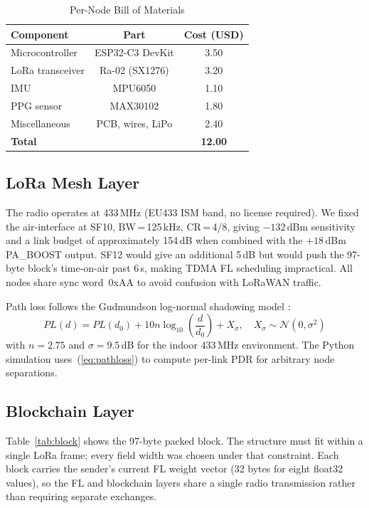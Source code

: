 \documentclass[journal]{IEEEtran}
\begin{document}
\begin{table}[t]
\centering
\caption{Per-Node Bill of Materials}
\label{tab:bom}
\renewcommand{\arraystretch}{1.2}
\begin{tabular}{lcc}
\toprule
\textbf{Component} & \textbf{Part} & \textbf{Cost (USD)} \\
\midrule
Microcontroller   & ESP32-C3 DevKit    & 3.50 \\
LoRa transceiver  & Ra-02 (SX1276)     & 3.20 \\
IMU               & MPU6050            & 1.10 \\
PPG sensor        & MAX30102           & 1.80 \\
Miscellaneous     & PCB, wires, LiPo   & 2.40 \\
\midrule
\textbf{Total}    &                    & \textbf{12.00} \\
\bottomrule
\end{tabular}
\end{table}

\subsection{LoRa Mesh Layer}

The radio operates at 433\,MHz (EU433 ISM band, no license required). We
fixed the air-interface at SF10, BW\,=\,125\,kHz, CR\,=\,4/8, giving
$-132$\,dBm sensitivity and a link budget of approximately 154\,dB when
combined with the $+18$\,dBm PA\_BOOST output. SF12 would give an
additional 5\,dB but would push the 97-byte block's time-on-air past
6\,s, making TDMA FL scheduling impractical. All nodes share sync
word~0xAA to avoid confusion with LoRaWAN traffic.

Path loss follows the Gudmundson log-normal shadowing model
\cite{Gudmundson1991}:
\begin{equation}
PL(d) = PL(d_0) + 10n\log_{10}\!\left(\frac{d}{d_0}\right) + X_\sigma,
\quad X_\sigma \sim \mathcal{N}(0,\sigma^2)
\label{eq:pathloss}
\end{equation}
with $n = 2.75$ and $\sigma = 9.5$\,dB for the indoor 433\,MHz
environment. The Python simulation uses~(\ref{eq:pathloss}) to compute
per-link PDR for arbitrary node separations.

\subsection{Blockchain Layer}

Table~\ref{tab:block} shows the 97-byte packed block. The structure
must fit within a single LoRa frame; every field width was chosen under
that constraint. Each block carries the sender's current FL weight vector
(32 bytes for eight float32 values), so the FL and blockchain layers share
a single radio transmission rather than requiring separate exchanges.
\end{document}
